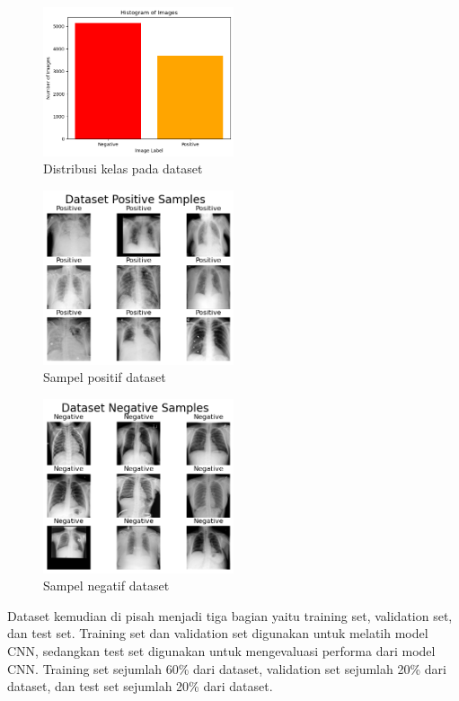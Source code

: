 \documentclass[conference]{IEEEtran}
\begin{document}
\begin{figure}[htbp]
    \centerline{\includegraphics[width=0.5\textwidth]{figures/distribusi_dataset_final.png}}
    \caption{Distribusi kelas pada dataset}
\end{figure}
\begin{figure}[htbp]
    \centerline{\includegraphics[width=0.5\textwidth]{figures/positive_samples.png}}
    \caption{Sampel positif dataset}
\end{figure}
\begin{figure}[htbp]
    \centerline{\includegraphics[width=0.5\textwidth]{figures/negative_samples.png}}
    \caption{Sampel negatif dataset}
\end{figure}
Dataset kemudian di pisah menjadi tiga bagian yaitu training set, validation set, dan test set. Training set dan validation set digunakan untuk melatih model CNN, sedangkan test set digunakan untuk mengevaluasi performa dari model CNN. Training set sejumlah 60\% dari dataset, validation set sejumlah 20\% dari dataset, dan test set sejumlah 20\% dari dataset.
\end{document}

